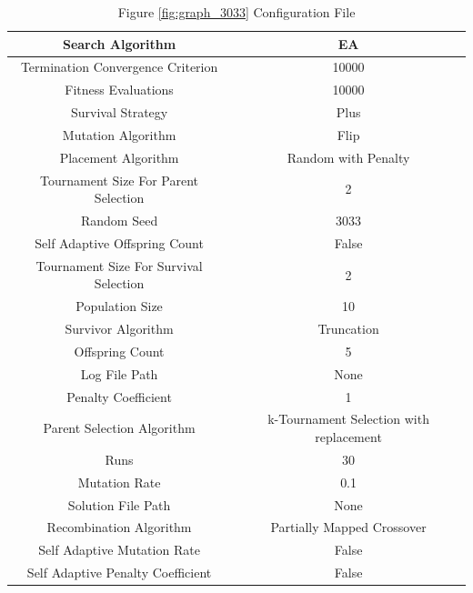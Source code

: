 \documentclass{standalone}
\begin{document}
\begin{table}[!htb]
	\centering
	\caption{Figure \ref{fig:graph_3033} Configuration File}
	\label{tab:graph_3033}
	\begin{tabular}{| c | c |}
		\hline
		Search Algorithm		& EA		 \\
		\hline
		Termination Convergence Criterion		& 10000		 \\
		\hline
		Fitness Evaluations		& 10000		 \\
		\hline
		Survival Strategy		& Plus		 \\
		\hline
		Mutation Algorithm		& Flip		 \\
		\hline
		Placement Algorithm		& Random with Penalty		 \\
		\hline
		Tournament Size For Parent Selection		& 2		 \\
		\hline
		Random Seed		& 3033		 \\
		\hline
		Self Adaptive Offspring Count		& False		 \\
		\hline
		Tournament Size For Survival Selection		& 2		 \\
		\hline
		Population Size		& 10		 \\
		\hline
		Survivor Algorithm		& Truncation		 \\
		\hline
		Offspring Count		& 5		 \\
		\hline
		Log File Path		& None		 \\
		\hline
		Penalty Coefficient		& 1		 \\
		\hline
		Parent Selection Algorithm		& k-Tournament Selection with replacement		 \\
		\hline
		Runs		& 30		 \\
		\hline
		Mutation Rate		& 0.1		 \\
		\hline
		Solution File Path		& None		 \\
		\hline
		Recombination Algorithm		& Partially Mapped Crossover		 \\
		\hline
		Self Adaptive Mutation Rate		& False		 \\
		\hline
		Self Adaptive Penalty Coefficient		& False		 \\
		\hline
	\end{tabular}
\end{table}
\end{document}
